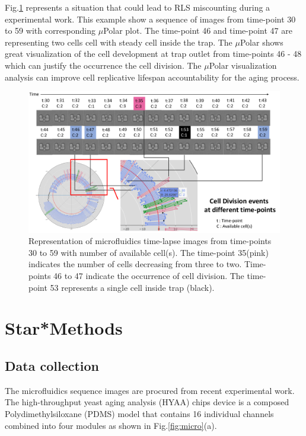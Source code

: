\documentclass[conference]{IEEEtran}
\begin{document}
Fig.\ref{fig:division} represents a situation that could lead to RLS miscounting during a  experimental work. This example show a sequence of images from time-point 30 to 59 with corresponding $\mu$Polar plot. The time-point 46 and time-point 47 are representing two cells  cell with steady cell inside the trap. The $\mu$Polar shows great visualization of the cell development at trap outlet from time-points 46 - 48 which can justify the occurrence the cell division. The $\mu$Polar visualization analysis can improve cell replicative lifespan accountability for the aging process.    


\begin{figure}
\centering
\includegraphics[width=\textwidth,height=10 cm]{Patterns/division.pdf}
\caption{ Representation of microfluidics time-lapse images from time-points 30 to 59 with number of available cell(s). The time-point 35(pink) indicates the number of cells decreasing from three to two. Time-points 46 to 47 indicate the occurrence of cell division. The time-point 53 represents a single cell inside trap (black).}
\label{fig:division}
\end{figure}


\section{Star*Methods}

\subsection*{Data collection}
The microfluidics sequence images are procured from \cite{ref13} recent experimental work. The high-throughput yeast aging analysis (HYAA) chips device is a composed Polydimethylsiloxane (PDMS) model that contains 16 individual channels combined into four modules as shown in Fig.\ref{fig:micro}(a).
\end{document}

